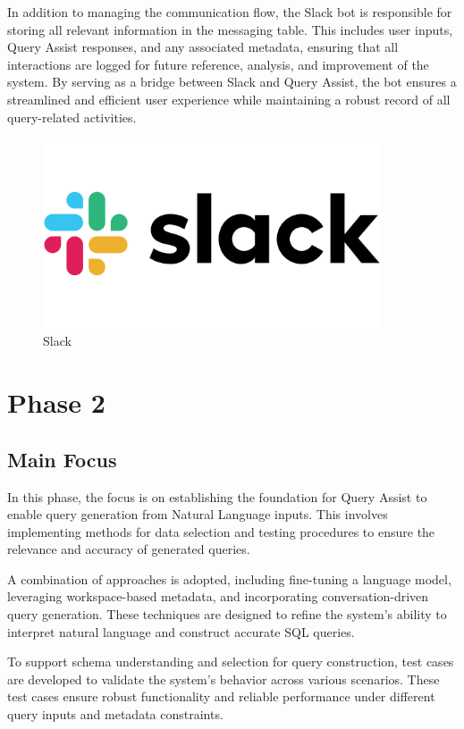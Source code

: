     In addition to managing the communication flow, the Slack bot is responsible for storing all relevant information in the messaging table. This includes user inputs, Query Assist responses, and any associated metadata, ensuring that all interactions are logged for future reference, analysis, and improvement of the system. By serving as a bridge between Slack and Query Assist, the bot ensures a streamlined and efficient user experience while maintaining a robust record of all query-related activities.
    \begin{figure}[H]
        \centering
        \includegraphics[width=10cm]{chapters/3/figures/Slack-Logo.png}
        \caption[Slack]{Slack}
        \label{fig:slack-logo}
    \end{figure}
\section{Phase 2}
    \subsection{Main Focus}
    In this phase, the focus is on establishing the foundation for Query Assist to enable query generation from Natural Language inputs. This involves implementing methods for data selection and testing procedures to ensure the relevance and accuracy of generated queries.

    A combination of approaches is adopted, including fine-tuning a language model, leveraging workspace-based metadata, and incorporating conversation-driven query generation. These techniques are designed to refine the system's ability to interpret natural language and construct accurate SQL queries.

    To support schema understanding and selection for query construction, test cases are developed to validate the system's behavior across various scenarios. These test cases ensure robust functionality and reliable performance under different query inputs and metadata constraints.

